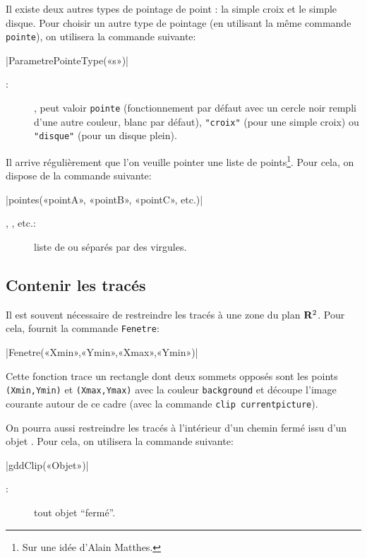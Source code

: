 \documentclass[a4paper,french]{article}
\begin{document}
Il existe deux autres types de pointage de point : la simple croix et le simple
disque. Pour choisir un autre type de pointage (en utilisant la même commande
\lstinline+pointe+), on utilisera la commande suivante:
\begin{colourband}
  \macro|ParametrePointeType(«s»)|
  \begin{description}
  \item[:] , peut valoir \lstinline+pointe+
  (fonctionnement par défaut avec un cercle noir rempli d’une autre couleur,
  blanc par défaut), \lstinline+"croix"+ (pour une simple croix) ou
  \lstinline+"disque"+ (pour un disque plein).
  \end{description} 
\end{colourband}

Il arrive régulièrement que l’on veuille pointer une liste de
points\footnote{Sur une idée d’Alain Matthes.}. Pour cela,
on dispose de la commande suivante:

\begin{colourband}
\macro|pointes(«pointA», «pointB», «pointC», etc.)|
\begin{description}
  \item[, , etc.:] liste de  ou
   séparés par des virgules.
\end{description}
\end{colourband}
  

\subsection{Contenir les tracés}

Il est souvent nécessaire de restreindre les tracés à une zone du plan $\mathbf{R}^2$.
Pour cela, \mpgeomdd fournit la commande \lstinline+Fenetre+:
\begin{colourband}
\macro|Fenetre(«Xmin»,«Ymin»,«Xmax»,«Ymin»)|
\end{colourband}
Cette fonction trace un rectangle dont deux sommets opposés sont les points
\lstinline|(Xmin,Ymin)| et \lstinline|(Xmax,Ymax)| avec la couleur \MP{}
\lstinline+background+ et découpe l'image courante autour de ce cadre (avec la
commande \MP{} \lstinline+clip currentpicture+).

On pourra aussi restreindre les tracés à l’intérieur d’un chemin fermé issu
d’un objet \mpgeomdd. Pour cela, on utilisera la commande suivante:
\begin{colourband}
\macro|gddClip(«Objet»)|
\begin{description}
\item[:] tout objet \mpgeomdd \enquote{fermé}.
\end{description}
\end{colourband}
  
\end{document}
